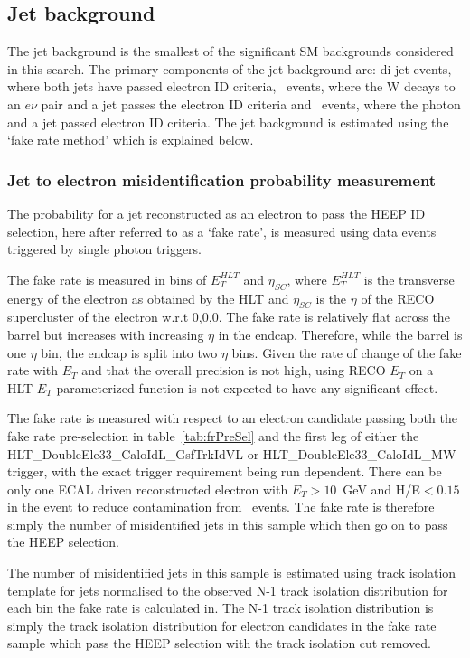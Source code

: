 \clearpage
\subsection{Jet background}
\label{FRsec}

The jet background is the smallest of the significant SM backgrounds considered in this search. The primary components of the jet background are: di-jet events, where both jets have passed electron ID criteria, \wjets\ events, where the W decays to an $e\nu$ pair and a jet passes the electron ID criteria and \phoJets\ events, where the photon and a jet passed electron ID criteria. The jet background is estimated using the `fake rate method' which is explained below.

\subsubsection{Jet to electron misidentification probability measurement}


The probability for a jet reconstructed as an electron to pass the HEEP ID selection, here after referred to as a `fake rate', is measured using data events triggered by single photon triggers.

The fake rate is measured in bins of $E_{T}^{HLT}$ and $\eta_{SC}$, where $E_{T}^{HLT}$ is the transverse energy of the electron as obtained by the HLT and $\eta_{SC}$ is the $\eta$ of the RECO supercluster of the electron w.r.t 0,0,0. The fake rate is relatively flat across the barrel but increases with increasing $\eta$ in the endcap. Therefore, while the barrel is one $\eta$ bin, the endcap is split into two $\eta$ bins.
Given the rate of change of the fake rate with $E_T$ and that the overall precision is not high, using RECO $E_T$ on a HLT $E_T$ parameterized function is not expected to have any significant effect.

The fake rate is measured with respect to an electron candidate passing both the fake rate pre-selection in table~\ref{tab:frPreSel} and the first leg of either the HLT\_DoubleEle33\_CaloIdL\_GsfTrkIdVL or HLT\_DoubleEle33\_CaloIdL\_MW trigger, with the exact trigger requirement being run dependent. There can be only one ECAL driven reconstructed electron with $E_{T}>10$~GeV and H/E$<0.15$ in the event to reduce contamination from \zee\ events. The fake rate is therefore simply the number of misidentified jets in this sample which then go on to pass the HEEP selection.

The number of misidentified jets in this sample is estimated using track isolation template for jets normalised to the observed N-1 track isolation distribution for each bin the fake rate is calculated in. The N-1 track isolation distribution is simply the track isolation distribution for electron candidates in the fake rate sample which pass the HEEP selection with the track isolation cut removed.

